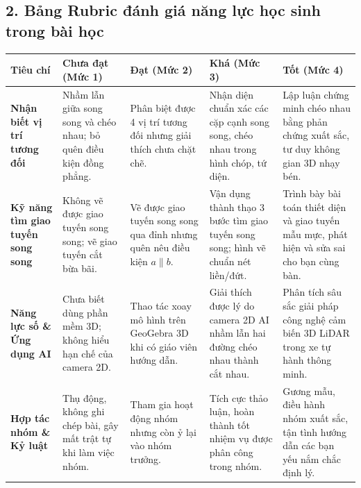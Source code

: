 \documentclass[12pt, a4paper]{article}
\begin{document}
\subsection*{2. Bảng Rubric đánh giá năng lực học sinh trong bài học}

\begin{center}
\small
\begin{tabularx}{\textwidth}{|p{2.8cm}|X|X|X|X|}
\hline
\textbf{Tiêu chí} & \textbf{Chưa đạt (Mức 1)} & \textbf{Đạt (Mức 2)} & \textbf{Khá (Mức 3)} & \textbf{Tốt (Mức 4)} \\ \hline
\textbf{Nhận biết vị trí tương đối} & Nhầm lẫn giữa song song và chéo nhau; bỏ quên điều kiện đồng phẳng. & Phân biệt được 4 vị trí tương đối nhưng giải thích chưa chặt chẽ. & Nhận diện chuẩn xác các cặp cạnh song song, chéo nhau trong hình chóp, tứ diện. & Lập luận chứng minh chéo nhau bằng phản chứng xuất sắc, tư duy không gian 3D nhạy bén. \\ \hline
\textbf{Kỹ năng tìm giao tuyến song song} & Không vẽ được giao tuyến song song; vẽ giao tuyến cắt bừa bãi. & Vẽ được giao tuyến song song qua đỉnh nhưng quên nêu điều kiện $a \parallel b$. & Vận dụng thành thạo 3 bước tìm giao tuyến song song; hình vẽ chuẩn nét liền/đứt. & Trình bày bài toán thiết diện và giao tuyến mẫu mực, phát hiện và sửa sai cho bạn cùng bàn. \\ \hline
\textbf{Năng lực số \& Ứng dụng AI} & Chưa biết dùng phần mềm 3D; không hiểu hạn chế của camera 2D. & Thao tác xoay mô hình trên GeoGebra 3D khi có giáo viên hướng dẫn. & Giải thích được lý do camera 2D AI nhầm lẫn hai đường chéo nhau thành cắt nhau. & Phân tích sâu sắc giải pháp công nghệ cảm biến 3D LiDAR trong xe tự hành thông minh. \\ \hline
\textbf{Hợp tác nhóm \& Kỷ luật} & Thụ động, không ghi chép bài, gây mất trật tự khi làm việc nhóm. & Tham gia hoạt động nhóm nhưng còn ỷ lại vào nhóm trưởng. & Tích cực thảo luận, hoàn thành tốt nhiệm vụ được phân công trong nhóm. & Gương mẫu, điều hành nhóm xuất sắc, tận tình hướng dẫn các bạn yếu nắm chắc định lý. \\ \hline
\end{tabularx}
\end{center}
\end{document}
